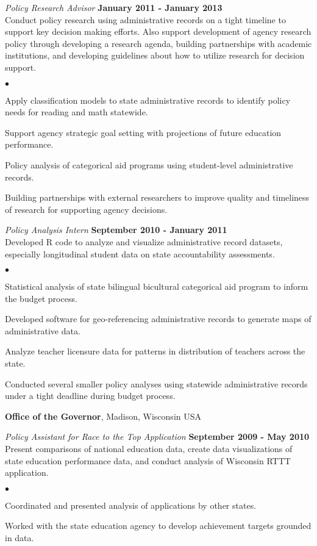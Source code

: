 \documentclass[margin,line]{res}
\newenvironment{list2}{
  \begin{list}{$\bullet$}{%
      \setlength{\itemsep}{0in}
      \setlength{\parsep}{0in} \setlength{\parskip}{0in}
      \setlength{\topsep}{0in} \setlength{\partopsep}{0in} 
      \setlength{\leftmargin}{0.2in}}}{\end{list}}
\begin{document}
\begin{resume}
\vspace{-.1cm}
{\em Policy Research Advisor} \hfill {\bf January 2011 - January 2013}\\
Conduct policy research using administrative records on a tight timeline to support key decision making efforts. Also support development of agency research policy through developing a research agenda, building partnerships with academic institutions, and developing guidelines about how to utilize research for decision support.
\begin{list2}
\item Apply classification models to state administrative records to identify policy needs for reading and math statewide.
\item Support agency strategic goal setting with projections of future education performance.
\item Policy analysis of categorical aid programs using student-level administrative records.
\item Building partnerships with external researchers to improve quality and timeliness of research for supporting agency decisions.
\end{list2}

\vspace{-.1cm}
{\em Policy Analysis Intern} \hfill {\bf September 2010 - January 2011}\\
Developed R code to analyze and visualize administrative record datasets, especially longitudinal student data on state accountability assessments. 
\begin{list2}
\item Statistical analysis of state bilingual bicultural categorical aid program to inform the budget process.
\item Developed software for geo-referencing administrative records to generate maps of administrative data.
\item Analyze teacher licensure data for patterns in distribution of teachers across the state.
\item Conducted several smaller policy analyses using statewide administrative records under a tight deadline during budget process.
\end{list2}

{\bf Office of the Governor}, Madison, Wisconsin USA

{\em Policy Assistant for Race to the Top Application} \hfill {\bf September 2009 - May 2010}\\
Present comparisons of national education data, create data visualizations of state education performance data, and conduct analysis of Wisconsin RTTT application. 
\begin{list2}
\item Coordinated and presented analysis of applications by other states.
\item Worked with the state education agency to develop achievement targets grounded in data.
\end{list2}


\end{resume}
\end{document}

